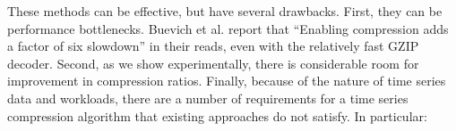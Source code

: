 
These methods can be effective, but have several drawbacks. First, they can be performance bottlenecks. Buevich et al. report that ``Enabling compression adds a factor of six slowdown'' \cite{respawnDB} in their reads, even with the relatively fast GZIP decoder. Second, as we show experimentally, there is considerable room for improvement in compression ratios. Finally, because of the nature of time series data and workloads, there are a number of requirements for a time series compression algorithm that existing approaches do not satisfy. In particular:






